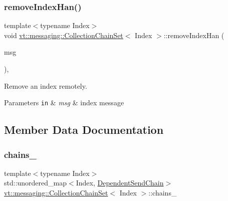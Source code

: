\subsubsection{\texorpdfstring{remove\+Index\+Han()}{removeIndexHan()}}
{\footnotesize\ttfamily template$<$typename Index$>$ \\
void \hyperlink{classvt_1_1messaging_1_1_collection_chain_set}{vt\+::messaging\+::\+Collection\+Chain\+Set}$<$ Index $>$\+::remove\+Index\+Han (\begin{DoxyParamCaption}\item[{\hyperlink{structvt_1_1messaging_1_1_collection_chain_set_1_1_idx_msg}{Idx\+Msg} $\ast$}]{msg }\end{DoxyParamCaption})\hspace{0.3cm}{\ttfamily [inline]}, {\ttfamily [private]}}



Remove an index remotely. 


\begin{DoxyParams}[1]{Parameters}
\mbox{\tt in}  & {\em msg} & index message \\
\hline
\end{DoxyParams}


\subsection{Member Data Documentation}
\mbox{\label{classvt_1_1messaging_1_1_collection_chain_set_afd05e48d93d231320364149fd538beab}} 
\subsubsection{\texorpdfstring{chains\+\_\+}{chains\_}}
{\footnotesize\ttfamily template$<$typename Index$>$ \\
std\+::unordered\+\_\+map$<$Index, \hyperlink{classvt_1_1messaging_1_1_dependent_send_chain}{Dependent\+Send\+Chain}$>$ \hyperlink{classvt_1_1messaging_1_1_collection_chain_set}{vt\+::messaging\+::\+Collection\+Chain\+Set}$<$ Index $>$\+::chains\+\_\+\hspace{0.3cm}{\ttfamily [private]}}



